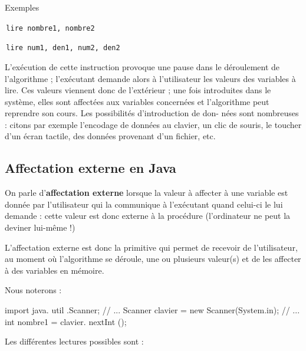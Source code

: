 \documentclass[11pt,a4paper]{article}
\begin{document}
          Exemples \par
				\par
				\,\verb|lire nombre1, nombre2|\,\par
				\par
				\,\verb|lire num1, den1, num2, den2|\,
            \par
        
          L'ex\'ecution de cette instruction provoque une pause dans le d\'eroulement de l'algorithme ;
          l'ex\'ecutant demande alors \`a l'utilisateur les valeurs des variables \`a lire. Ces valeurs viennent
          donc de l'ext\'erieur ; une fois introduites dans le syst\`eme, elles sont affect\'ees aux variables
          concern\'ees et l'algorithme peut reprendre son cours. Les possibilit\'es d'introduction de don-
          n\'ees sont nombreuses : citons par exemple l'encodage de donn\'ees au clavier, un clic de souris,
          le toucher d'un \'ecran tactile, des donn\'ees provenant d'un fichier, etc.
        
            \par
        \subsection{Affectation externe en Java}
          On parle d'\textbf{affectation externe} lorsque la valeur \`a affecter \`a une variable
           est donn\'ee par l'utilisateur qui la communique \`a l'ex\'ecutant quand celui-ci le lui demande : cette valeur est
          donc externe \`a la proc\'edure (l'ordinateur ne peut la deviner lui-m\^eme !)
        
            \par
        
          L'affectation externe est donc la primitive qui permet de recevoir de l'utilisateur, au moment
          o\`u l'algorithme se d\'eroule, une ou plusieurs valeur(s) et de les affecter \`a des variables en
          m\'emoire. 
        
            \par
        
          Nous noterons :
          
            \par
        \begin{Java}
 import java. util .Scanner;
// ...
Scanner clavier = new Scanner(System.in);
// ...
int nombre1 = clavier. nextInt ();
				\end{Java}
          Les diff\'erentes lectures possibles sont :
          
\end{document}
